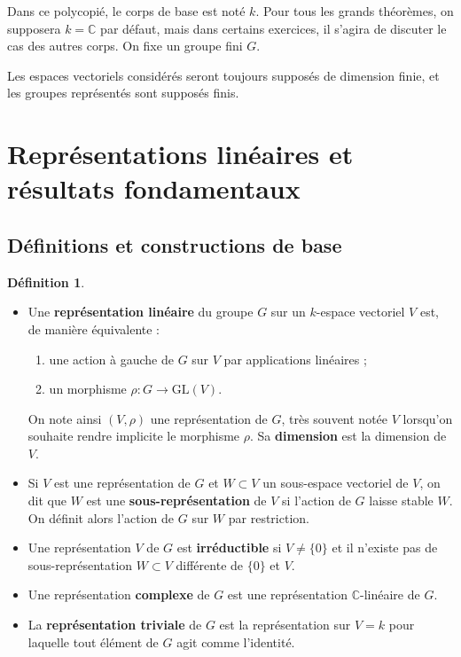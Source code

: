 \documentclass[a4paper]{article}
\theoremstyle{definition} %
\newtheorem{Def}{Définition}[section] %
\theoremstyle{plain} %
\theoremstyle{remark} %
\begin{document}
\newpage

	Dans ce polycopié, le corps de base est noté $k$. Pour tous les grands théorèmes, on supposera $k=\mathbb{C}$ par défaut, mais dans certains exercices, il s'agira de discuter le cas des autres corps. On fixe un groupe fini $G$.
	
	Les espaces vectoriels considérés seront toujours supposés de dimension finie, et les groupes représentés sont supposés finis.
	
\section{Représentations linéaires et résultats fondamentaux}

\subsection{Définitions et constructions de base}
	
\begin{Def}
 	\hspace*{\fill}
 	 \begin{itemize}
 	 	
 	 	\item Une \textbf{représentation linéaire} du groupe $G$ sur un $k$-espace vectoriel $V$ est, de manière équivalente :
 	 	\begin{enumerate}[label=(\roman*)]
 	 		\item une action à gauche de $G$ sur $V$ par applications linéaires ;
 	 		\item un morphisme $\rho : G \rightarrow \mathrm{GL}(V)$.
 	 	\end{enumerate}
 	
 	On note ainsi $(V, \rho)$ une représentation de $G$, très souvent notée $V$ lorsqu'on souhaite rendre implicite le morphisme $\rho$. Sa \textbf{dimension} est la dimension de $V$.
 	
 	\item Si $V$ est une représentation de $G$ et $W \subset V$ un sous-espace vectoriel de $V$, on dit que $W$ est une \textbf{sous-représentation} de $V$ si l'action de $G$ laisse stable $W$.
 	On définit alors l'action de $G$ sur $W$ par restriction.
 	 	 	
 	 \item Une représentation $V$ de $G$ est \textbf{irréductible} si $V \neq \{0\}$ et il n'existe pas de sous-représentation $W \subset V$ différente de $\{0\}$ et $V$.
 	
 	\item Une représentation \textbf{complexe} de $G$ est une représentation $\mathbb{C}$-linéaire de $G$.
	
	\item La \textbf{représentation triviale} de $G$ est la représentation sur $V=k$ pour laquelle tout élément de $G$ agit comme l'identité.
 \end{itemize}
\end{Def}
\end{document}

